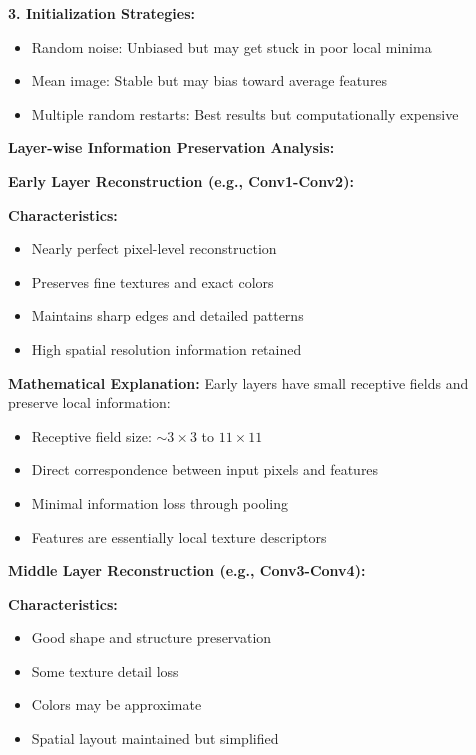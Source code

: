 \documentclass[12pt]{article}
\begin{document}
\begin{enumerate}[(a)]
{    \textbf{3. Initialization Strategies:}
    \begin{itemize}
        \item Random noise: Unbiased but may get stuck in poor local minima
        \item Mean image: Stable but may bias toward average features
        \item Multiple random restarts: Best results but computationally expensive
    \end{itemize}
    
    \textbf{Layer-wise Information Preservation Analysis:}
    
    \textbf{Early Layer Reconstruction (e.g., Conv1-Conv2):}
    
    \textbf{Characteristics:}
    \begin{itemize}
        \item Nearly perfect pixel-level reconstruction
        \item Preserves fine textures and exact colors
        \item Maintains sharp edges and detailed patterns
        \item High spatial resolution information retained
    \end{itemize}
    
    \textbf{Mathematical Explanation:}
    Early layers have small receptive fields and preserve local information:
    \begin{itemize}
        \item Receptive field size: $\sim 3 \times 3$ to $11 \times 11$
        \item Direct correspondence between input pixels and features
        \item Minimal information loss through pooling
        \item Features are essentially local texture descriptors
    \end{itemize}
    
    \textbf{Middle Layer Reconstruction (e.g., Conv3-Conv4):}
    
    \textbf{Characteristics:}
    \begin{itemize}
        \item Good shape and structure preservation
        \item Some texture detail loss
        \item Colors may be approximate
        \item Spatial layout maintained but simplified
    \end{itemize}
    
}
\end{enumerate}
\end{document}
